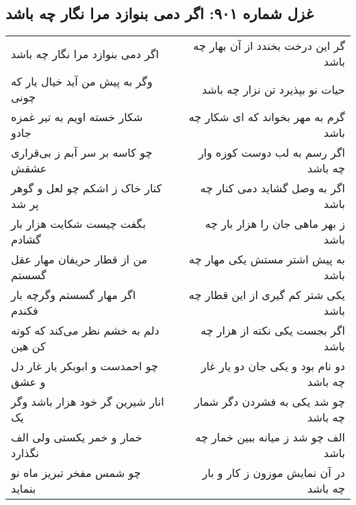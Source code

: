 \begin{center}
\section*{غزل شماره ۹۰۱: اگر دمی بنوازد مرا نگار چه باشد}
\label{sec:0901}
\begin{longtable}{l p{0.5cm} r}
اگر دمی بنوازد مرا نگار چه باشد
&&
گر این درخت بخندد از آن بهار چه باشد
\\
وگر به پیش من آید خیال یار که چونی
&&
حیات نو بپذیرد تن نزار چه باشد
\\
شکار خسته اویم به تیر غمزه جادو
&&
گرم به مهر بخواند که ای شکار چه باشد
\\
چو کاسه بر سر آبم ز بی‌قراری عشقش
&&
اگر رسم به لب دوست کوزه وار چه باشد
\\
کنار خاک ز اشکم چو لعل و گوهر پر شد
&&
اگر به وصل گشاید دمی کنار چه باشد
\\
بگفت چیست شکایت هزار بار گشادم
&&
ز بهر ماهی جان را هزار بار چه باشد
\\
من از قطار حریفان مهار عقل گسستم
&&
به پیش اشتر مستش یکی مهار چه باشد
\\
اگر مهار گسستم وگرچه بار فکندم
&&
یکی شتر کم گیری از این قطار چه باشد
\\
دلم به خشم نظر می‌کند که کوته کن هین
&&
اگر بجست یکی نکته از هزار چه باشد
\\
چو احمدست و ابوبکر یار غار دل و عشق
&&
دو نام بود و یکی جان دو یار غار چه باشد
\\
انار شیرین گر خود هزار باشد وگر یک
&&
چو شد یکی به فشردن دگر شمار چه باشد
\\
خمار و خمر یکستی ولی الف نگذارد
&&
الف چو شد ز میانه ببین خمار چه باشد
\\
چو شمس مفخر تبریز ماه نو بنماید
&&
در آن نمایش موزون ز کار و بار چه باشد
\\
\end{longtable}
\end{center}
